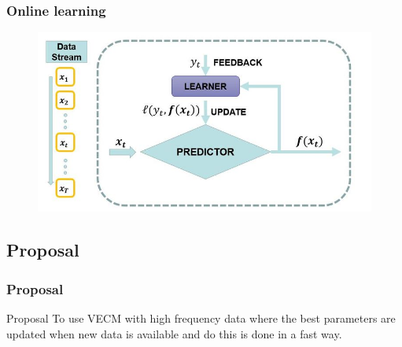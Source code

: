 \documentclass{beamer}
\begin{document}
\begin{frame}
\frametitle{Online learning}
\begin{figure}
\includegraphics[width=0.8\paperwidth]{img/onlinelearning}
\end{figure}
\end{frame}

\subsection{Proposal}
\begin{frame}
\frametitle{Proposal}
\begin{block}{Proposal}
To use VECM with high frequency data where the best parameters are updated when new data is available and do this is done in a fast way.
\end{block}
\end{frame}

%
%
\end{document}
